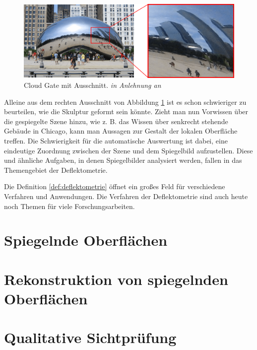 \begin{figure}[H]
	\centering
	\includegraphics[width=\textwidth]{02_grundlagenDerDeflektometrie/figures/cloudGateMitAusschnitt}
	\caption[Cloud Gate mit Ausschnitt]{Cloud Gate mit Ausschnitt. \textit{in Anlehnung an} \cite{cloudGateChicago}}
	\label{img:cloudGateMitAusschnitt}
\end{figure}

\noindent
Alleine aus dem rechten Ausschnitt von Abbildung \ref{img:cloudGateMitAusschnitt} ist es schon schwieriger zu beurteilen, wie die Skulptur geformt sein könnte.
Zieht man nun Vorwissen über die gespiegelte Szene hinzu, wie z. B. das Wissen über senkrecht stehende Gebäude in Chicago, kann man Aussagen zur Gestalt der lokalen Oberfläche treffen.
Die Schwierigkeit für die automatische Auswertung ist dabei, eine eindeutige Zuordnung zwischen der Szene und dem Spiegelbild aufzustellen.
Diese und ähnliche Aufgaben, in denen Spiegelbilder analysiert werden, fallen in das Themengebiet der Deflektometrie.

\p
Die Definition \ref{def:deflektometrie} öffnet ein großes Feld für verschiedene Verfahren und Anwendungen.
Die Verfahren der Deflektometrie sind auch heute noch Themen für viele Forschungsarbeiten.

{
	\FloatBarrier
    \section{Spiegelnde Oberflächen}
    \label{sec:spiegelndeOberflaechen}
    
}

{
	\FloatBarrier
    \section{Rekonstruktion von spiegelnden Oberflächen}
    \label{sec:rekonstruktion}
    
}

{
	\FloatBarrier
    \section{Qualitative Sichtprüfung}
    \label{sec:qualitativeSichtpruefung}
    
}